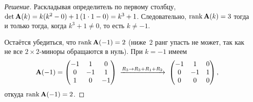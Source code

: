 \begin{proof}[Решение]
Раскладывая определитель по первому столбцу,
$\det \mathbf{A}(k) = k(k^2 - 0) + 1\,(1 \cdot 1 - 0) = k^3 + 1$.
Следовательно, $\operatorname{rank} \mathbf{A}(k) = 3$ тогда и только тогда, когда
$k^3 + 1 \neq 0$, то есть $k \neq -1$.

Остаётся убедиться, что $\operatorname{rank} \mathbf{A}(-1) = 2$ (ниже~$2$ ранг упасть
не может, так как не все $2 \times 2$-миноры обращаются в нуль). При
$k = -1$ имеем
\[
  \mathbf{A}(-1) =
  \begin{pmatrix}
    -1 & 1 & 0 \\
    0 & -1 & 1 \\
    1 & 0 & -1
  \end{pmatrix}
  \;\xrightarrow{R_3 \to R_3 + R_1 + R_2}\;
  \begin{pmatrix}
    -1 & 1 & 0 \\
    0 & -1 & 1 \\
    0 & 0 & 0
  \end{pmatrix},
\]
откуда $\operatorname{rank} \mathbf{A}(-1) = 2$.
\end{proof}

